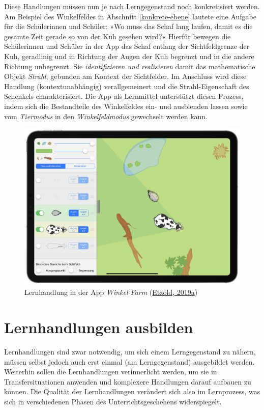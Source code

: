\documentclass[
]{scrbook}
\theoremstyle{definition}
\theoremstyle{definition}
\theoremstyle{definition}
\theoremstyle{definition}
\theoremstyle{remark}
\begin{document}
Diese Handlungen müssen nun je nach Lerngegenstand noch konkretisiert werden. Am Beispiel des Winkelfeldes in Abschnitt \ref{konkrete-ebene} lautete eine Aufgabe für die Schülerinnen und Schüler: »Wo muss das Schaf lang laufen, damit es die gesamte Zeit gerade so von der Kuh gesehen wird?« Hierfür bewegen die Schülerinnen und Schüler in der App das Schaf entlang der Sichtfeldgrenze der Kuh, geradlinig und in Richtung der Augen der Kuh begrenzt und in die andere Richtung unbegrenzt. Sie \emph{identifizieren und realisieren} damit das mathematische Objekt \emph{Strahl}, gebunden am Kontext der Sichtfelder. Im Anschluss wird diese Handlung (kontextunabhängig) verallgemeinert und die Strahl-Eigenschaft des Schenkels charakterisiert. Die App als Lernmittel unterstützt diesen Prozess, indem sich die Bestandteile des Winkelfeldes ein- und ausblenden lassen sowie vom \emph{Tiermodus} in den \emph{Winkelfeldmodus} gewechselt werden kann.



\begin{figure}

{\centering \includegraphics[width=0.5\linewidth]{pictures/1-Winkelfarm} 

}

\caption{Lernhandlung in der App \emph{Winkel-Farm} (\protect\hyperlink{ref-Etzold:2019}{Etzold, 2019a})}\label{fig:HandlungSchaf}
\end{figure}

\hypertarget{lernhandlungen-ausbilden}{%
\section{Lernhandlungen ausbilden}\label{lernhandlungen-ausbilden}}

Lernhandlungen sind zwar notwendig, um sich einem Lerngegenstand zu nähern, müssen selbst jedoch auch erst einmal (am Lerngegenstand) ausgebildet werden. Weiterhin sollen die Lernhandlungen verinnerlicht werden, um sie in Transfersituationen anwenden und komplexere Handlungen darauf aufbauen zu können. Die Qualität der Lernhandlungen verändert sich also im Lernprozess, was sich in verschiedenen Phasen des Unterrichtsgeschehens widerspiegelt.
\end{document}
